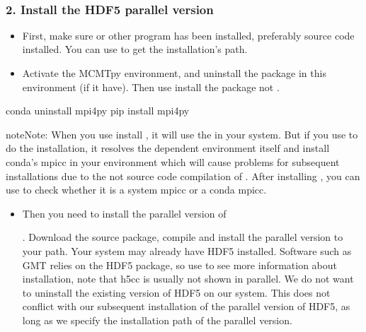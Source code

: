 \documentclass[a4paper,10pt,english,openany]{sphinxmanual}
\begin{document}
🚨  🚨


\subsubsection{2. Install the HDF5 parallel version}
\label{\detokenize{installation:install-the-hdf5-parallel-version}}\begin{itemize}
\item {} 
First, make sure  or other  program has been installed, preferably source code installed.
You can use  to get the installation’s path.

\item {} 
Activate the MCMTpy environment, and uninstall the  package in this environment (if it have).
Then use  install the  package not .

\end{itemize}

\begin{sphinxVerbatim}[commandchars=\\\{\}]
\PYGZdl{} conda uninstall mpi4py
\PYGZdl{} pip install mpi4py
\end{sphinxVerbatim}

\begin{sphinxadmonition}{note}{Note:}
When you use  install , it will use the  in your system. But if you use 
to do the installation, it resolves the dependent environment itself and install conda’s mpicc in your
environment which will cause problems for subsequent installations due to the not source code compilation
of . After installing , you can use  to check whether it is a system
mpicc or a conda mpicc.
\end{sphinxadmonition}
\begin{itemize}
\item {} 
Then you need to install the parallel version of %
\begin{footnote}[7]\sphinxAtStartFootnote
{}
%
\end{footnote}. Download the source
package, compile and install the parallel version to your path.
Your system may already have HDF5 installed. Software such as GMT relies on the HDF5 package, so use 
to see more information about installation, note that h5cc is usually not shown in parallel. We do not want to uninstall
the existing version of HDF5 on our system. This does not conflict with our subsequent installation of the parallel
version of HDF5, as long as we specify the installation path of the parallel version.

\end{itemize}
\end{document}
